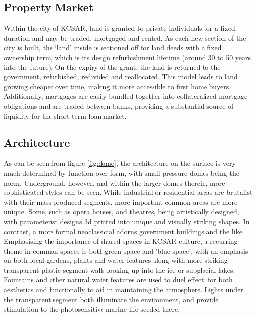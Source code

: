 \documentclass[fleqn,10pt]{Stylesheet} %
\begin{document}
\subsection{Property Market}
Within the city of KCSAR, land is granted to private individuals for a fixed duration and may be traded, mortgaged and rented. As each new section of the city is built, the ‘land’ inside is sectioned off for land deeds with a fixed ownership term, which is its design refurbishment lifetime (around 30 to 50 years into the future). On the expiry of the grant, the land is returned to the government, refurbished, redivided and reallocated. This model leads to land growing cheaper over time, making it more accessible to first home buyers. Additionally, mortgages are easily bundled together into collateralized mortgage obligations and are traded between banks, providing a substantial source of liquidity for the short term loan market.

\subsection{Architecture}
As can be seen from figure \ref{fig:dome}, the architecture on the surface is very much determined by function over form, with small pressure domes being the norm. Underground, however, and within the larger domes therein, more sophisticated styles can be seen. While industrial or residential areas are brutalist with their mass produced segments, more important common areas are more unique. Some, such as opera houses, and theatres, being artistically designed, with parameterist designs 3d printed into unique and visually striking shapes. In contrast, a more formal neoclassicial adorns government buildings and the like. Emphasising the importance of shared spaces in KCSAR culture, a recurring theme in common spaces is both green space and 'blue space', with an emphasis on both local gardens, plants and water features along with more striking transparent plastic segment walls looking up into the ice or subglacial lakes. Fountains and other natural water features are used to duel effect: for both aesthetics and functionally to aid in maintaining the atmosphere. Lights under the transparent segment both illuminate the environment, and provide stimulation to the photosensitive marine life seeded there.
\end{document}
